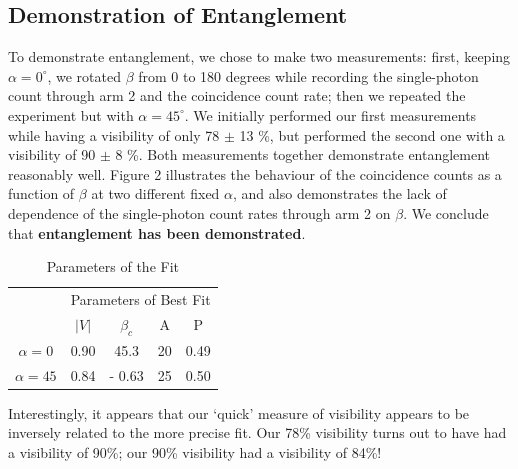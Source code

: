\documentclass[10pt,a4paper]{article}
\begin{document}
\subsection*{Demonstration of Entanglement}
\noindent To demonstrate entanglement, we chose to make two measurements: first, keeping $\alpha = 0^{\circ}$, we rotated $\beta$ from 0 to 180 degrees while recording the single-photon count through arm 2 and the coincidence count rate; then we repeated the experiment but with $\alpha = 45^{\circ}$. We initially performed our first measurements while having a visibility of only 78 $\pm$ 13 \%, but performed the second one with a visibility of 90 $\pm$ 8 \%. Both measurements together demonstrate entanglement reasonably well. Figure 2 illustrates the behaviour of the coincidence counts as a function of $\beta$ at two different fixed $\alpha$, and also demonstrates the lack of dependence of the single-photon count rates through arm 2 on $\beta$. We conclude that \textbf{entanglement has been demonstrated}.
\begin{table}[H]
\centering
\begin{tabular}{|c|c|c|c|c|}
\hline
& \multicolumn{4}{|c|}{Parameters of Best Fit}\\
& $\lvert V \rvert$ & $\beta_{c}$ & A & P\\
\hline
$\alpha = 0$ & 0.90 & 45.3 & 20  & 0.49\\
$\alpha = 45$ & 0.84 & - 0.63 & 25 & 0.50\\
\hline
\end{tabular}
\caption{Parameters of the Fit}
\end{table}
\noindent Interestingly, it appears that our `quick' measure of visibility appears to be inversely related to the more precise fit. Our 78\% visibility turns out to have had a visibility of 90\%; our 90\% visibility had a visibility of 84\%!
\end{document}
